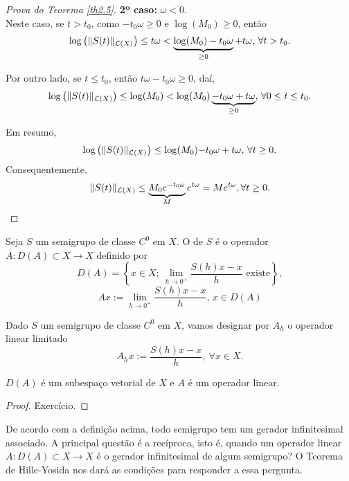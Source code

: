 \begin{proof}[Prova do Teorema \ref{th2.5}]
\noindent\textbf{2º caso:} $\omega< 0$.\\
Neste caso, se $t>t_0$, como $-t_0\omega\geq 0$ e $\log(M_0)\geq 0$, então
\begin{equation*}
\log\left(\|S(t)\|_{\mathcal{L}(X)}\right)\leq t\omega<\underbrace{\log(M_0)-t_0\omega}_{\geq 0}+t\omega, \, \forall t>t_0. 
\end{equation*}

Por outro lado, se $t\leq t_0$, então $t\omega-t_0\omega\geq 0$, daí,
\begin{equation*}
\log\left(\|S(t)\|_{\mathcal{L}(X)}\right)\leq \log(M_0)<\log(M_0)\underbrace{-t_0\omega+t\omega}_{\geq 0}, \, \forall 0\leq t\leq t_0. 
\end{equation*}

Em resumo,
\begin{equation*}
\log\left(\|S(t)\|_{\mathcal{L}(X)}\right)\leq \log(M_0){-t_0\omega+t\omega}, \, \forall t\geq 0. 
\end{equation*}
Consequentemente,
\begin{equation*}
    \|S(t)\|_{\mathcal{L}(X)}\leq \underbrace{M_0e^{-t_0\omega}}_{M}e^{t\omega}=Me^{t\omega}, \forall t\geq 0.
\end{equation*}
\end{proof}

\begin{definition}\label{def-ger}
    Seja $S$ um semigrupo de classe $C^0$ em $X$. O  de $S$ é o operador $A:D(A)\subset X\longrightarrow X$ definido por 
\[D(A)=\left\{x\in X;\ \lim\limits_{h\to 0^+} \frac{S(h)x-x}{h} \text{ existe}\right\},\]
\[Ax:=\lim\limits_{h\to 0^+} \frac{S(h)x-x}{h},\, x\in D(A)\]
\end{definition}

Dado $S$ um semigrupo de classe $C^0$ em $X$, vamos designar por $A_h$ o operador linear limitado 
    \[A_hx:=\frac{S(h)x-x}{h},\ \forall x\in X.\]

\begin{proposition}\label{DAsubspace}
     $D(A)$ é um subespaço vetorial de $X$ e $A$ é um operador linear.
\end{proposition}
\begin{proof}
    Exercício.
\end{proof}


\begin{remark}
De acordo com a definição acima, todo semigrupo tem um gerador infinitesimal associado. A principal questão é a recíproca, isto é, {\color{blue} quando um operador linear $A:D(A)\subset X\longrightarrow X$ é o gerador infinitesimal de algum semigrupo?} O Teorema de Hille-Yosida nos dará as condições para responder a essa pergunta.
\end{remark}


